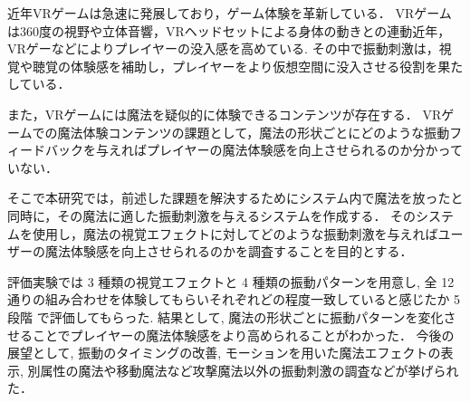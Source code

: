 近年VRゲームは急速に発展しており，ゲーム体験を革新している．
VRゲームは360度の視野や立体音響，VRヘッドセットによる身体の動きとの連動近年，VRゲーなどによりプレイヤーの没入感を高めている.
その中で振動刺激は，視覚や聴覚の体験感を補助し，プレイヤーをより仮想空間に没入させる役割を果たしている．


また，VRゲームには魔法を疑似的に体験できるコンテンツが存在する．
VRゲームでの魔法体験コンテンツの課題として，魔法の形状ごとにどのような振動フィードバックを与えればプレイヤーの魔法体験感を向上させられるのか分かっていない．

そこで本研究では，前述した課題を解決するためにシステム内で魔法を放ったと同時に，その魔法に適した振動刺激を与えるシステムを作成する．
そのシステムを使用し，魔法の視覚エフェクトに対してどのような振動刺激を与えればユーザーの魔法体験感を向上させられるのかを調査することを目的とする．

評価実験では 3 種類の視覚エフェクトと 4 種類の振動パターンを用意し, 全 12 通りの組み合わせを体験してもらいそれぞれどの程度一致していると感じたか 5 段階
で評価してもらった. 
結果として, 魔法の形状ごとに振動パターンを変化させることでプレイヤーの魔法体験感をより高められることがわかった．
今後の展望として, 振動のタイミングの改善, モーションを用いた魔法エフェクトの表示, 別属性の魔法や移動魔法など攻撃魔法以外の振動刺激の調査などが挙げられた．
